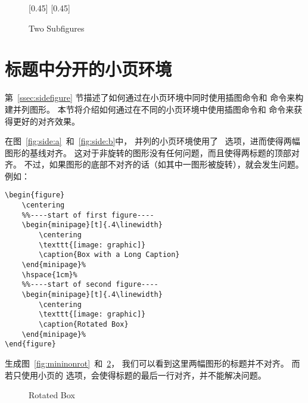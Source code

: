 \begin{figure}
	\centering
	[0.45\linewidth]{\resizebox{1.1in}{!}{\usebox{\boxgraphic}}}
	\hfill
	[0.45\linewidth]{\resizebox{1.5in}{!}{\usebox{\boxgraphic}}}
	\caption{Two Subfigures}
	\label{fig:specwid:subfig} %
\end{figure}

\section{标题中分开的小页环境}

第~\ref{ssec:sidefigure} 节描述了如何通过在小页环境中同时使用插图命令和  命令来构建并列图形。
本节将介绍如何通过在不同的小页环境中使用插图命令和  命令来获得更好的对齐效果。

在图~\ref{fig:side:a}~和~\ref{fig:side:b}中，
并列的小页环境使用了 \opt{[t]}~选项，进而使得两幅图形的基线对齐。
这对于非旋转的图形没有任何问题，而且使得两标题的顶部对齐。
不过，如果图形的底部不对齐的话（如其中一图形被旋转），就会发生问题。例如：
\begin{lstlisting}
\begin{figure}
	\centering
	%%----start of first figure----
	\begin{minipage}[t]{.4\linewidth}
		\centering
		\texttt{[image: graphic]}
		\caption{Box with a Long Caption}
	\end{minipage}%
	\hspace{1cm}%
	%%----start of second figure----
	\begin{minipage}[t]{.4\linewidth}
		\centering
		\texttt{[image: graphic]}
		\caption{Rotated Box}
	\end{minipage}%
\end{figure}
\end{lstlisting}
生成图~\ref{fig:mininonrot}~和~\ref{fig:minirot}，
我们可以看到这里两幅图形的标题并不对齐。
而若只使用小页的 \opt{[b]} 选项，会使得标题的最后一行对齐，并不能解决问题。

\begin{figure}
	\centering
	\begin{minipage}[t]{.4\linewidth}
		\centering
		\resizebox{2cm}{!}{\usebox{\boxgraphic}}
		\caption{Box with a Long Caption}\label{fig:mininonrot} 
	\end{minipage}%
	\hspace{1cm}%
	\begin{minipage}[t]{.4\linewidth}
		\centering
		\caption{Rotated Box}\label{fig:minirot} 
	\end{minipage}%
\end{figure}

